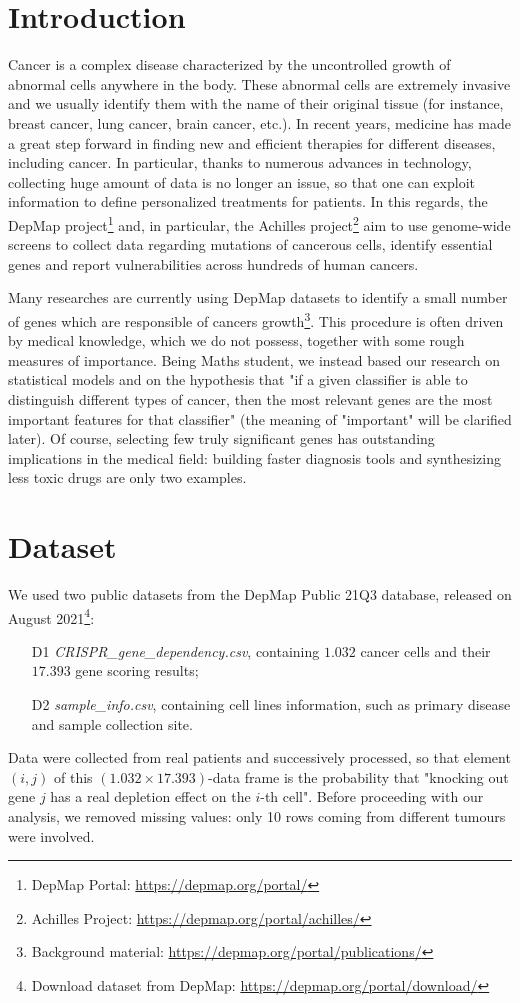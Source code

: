 \documentclass[a4paper,11pt, oneside]{article}  %
\begin{document}
	
	\section{Introduction}
	Cancer is a complex disease characterized by the uncontrolled growth of abnormal cells anywhere in the body. These abnormal cells are extremely invasive and we usually identify them with the name of their original tissue (for instance, breast cancer, lung cancer,  brain cancer, etc.).  In recent years, medicine has made a great step forward in finding new and efficient therapies for different diseases, including cancer.  In particular,  thanks to numerous advances in technology,  collecting huge amount of data is no longer an issue, so that one can exploit information to define personalized treatments for patients. In this regards, the DepMap project\footnote{DepMap Portal: \url{https://depmap.org/portal/} } and,  in particular,  the Achilles project\footnote{Achilles Project: \url{https://depmap.org/portal/achilles/} } aim to use genome-wide screens to collect data regarding mutations of cancerous cells,  identify essential genes and report vulnerabilities across hundreds of human cancers. 
	
	Many researches are currently using DepMap datasets to identify a small number of genes which are responsible of cancers growth\footnote{Background material: \url{https://depmap.org/portal/publications/}}. This procedure is often driven by medical knowledge,  which we do not possess,  together with some rough measures of importance.  Being Maths student, we instead based our research on statistical models and on the hypothesis that "if a given classifier is able to distinguish different types of cancer, then the most relevant genes are the most important features for that classifier" (the meaning of "important" will be clarified later).  Of course,  selecting few truly significant genes has outstanding implications in the medical field: building faster diagnosis tools and synthesizing less toxic drugs are only two examples. 
	
	
	\section{Dataset}
	We used two public datasets from the DepMap Public 21Q3 database,  released on August 2021\footnote{Download dataset from DepMap:  \url{https://depmap.org/portal/download/}}:
	\begin{itemize}
		\item[D1] \textit{CRISPR\_gene\_dependency.csv},  containing $1.032$ cancer cells and their $17.393$ gene scoring results;
		\item[D2] \textit{sample\_info.csv}, containing cell lines information,  such as primary disease and sample collection site.
	\end{itemize}
	Data were collected from real patients and successively processed,  so that element $(i, j)$ of this $(1.032 \times 17.393)$-data frame is the probability that "knocking out gene $j$ has a real depletion effect on the $i$-th cell".
	Before proceeding with our analysis, we removed missing values: only 10 rows coming from different tumours were involved. 
	
\end{document}

